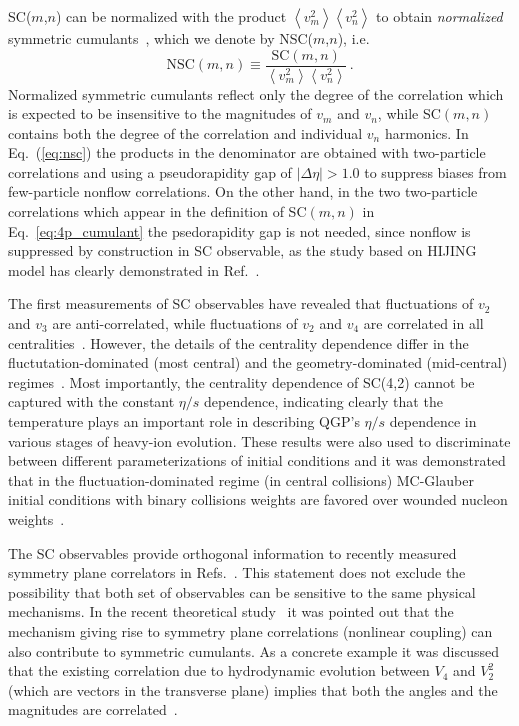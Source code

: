 \documentclass[ALICE,manyauthors]{cernphprep}
\begin{document}
SC($m$,$n$) can be normalized with the product $\left<v_{m}^2\right>\left<v_{n}^2\right>$ to obtain \textit{normalized} symmetric cumulants~\cite{ALICE:2016kpq,Giacalone:2016afq}, which we denote by NSC($m$,$n$), i.e.
%
\begin{equation}
\mathrm{NSC}(m,n) \equiv \frac{\mathrm{SC}(m,n)}{\left<v_{m}^2\right>\left<v_{n}^2\right>}\,.
\label{eq:nsc}
\end{equation}
%
Normalized symmetric cumulants reflect only the degree of the correlation which is expected to be insensitive to the magnitudes of $v_{m}$ and $v_{n}$, while SC$(m,n)$ contains both the degree of the correlation and individual $v_{n}$ harmonics. In Eq.~(\ref{eq:nsc}) the products in the denominator are obtained with two-particle correlations and using a pseudorapidity gap of $|\Delta\eta|>1.0$ to suppress biases from few-particle nonflow correlations. On the other hand, in the two two-particle correlations which appear in the definition of SC$(m,n)$ in Eq.~\ref{eq:4p_cumulant} the psedorapidity gap is not needed, since nonflow is suppressed by construction in SC observable, as the study based on HIJING model has clearly demonstrated in Ref.~\cite{ALICE:2016kpq}.

The first measurements of SC observables have revealed that fluctuations of $v_2$ and $v_3$ are anti-correlated, while fluctuations of $v_2$ and $v_4$ are correlated in all centralities~\cite{ALICE:2016kpq}. However, the details of the centrality dependence differ in the fluctutation-dominated (most central) and the geometry-dominated (mid-central) regimes~\cite{ALICE:2016kpq}. Most importantly, the centrality dependence of SC(4,2) cannot be captured with the constant $\eta/s$ dependence, indicating clearly that the temperature plays an important role in describing QGP's $\eta/s$ dependence in various stages of heavy-ion evolution. These results were also used to discriminate between different parameterizations of initial conditions and it was demonstrated that in the fluctuation-dominated regime (in central collisions) MC-Glauber initial conditions with binary collisions weights are favored over wounded nucleon weights~\cite{ALICE:2016kpq}. 

The SC observables provide orthogonal information to recently measured symmetry plane correlators in Refs.~\cite{ALICE:2011ab,Adare:2011tg,Aad:2014fla}. This statement does not exclude the possibility that both set of observables can be sensitive to the same physical mechanisms. In the recent theoretical study~\cite{Giacalone:2016afq} it was pointed out that the mechanism giving rise to symmetry plane correlations (nonlinear coupling) can also contribute to symmetric cumulants. As a concrete example it was discussed that the existing correlation due to hydrodynamic evolution between $V_4$ and $V_2^2$ (which are vectors in the transverse plane) implies that both the angles and the magnitudes are correlated~\cite{Giacalone:2016afq}. 
\end{document}
